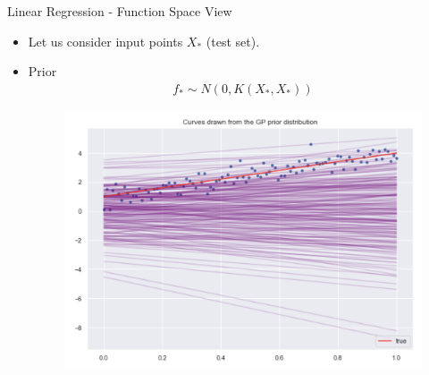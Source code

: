 \documentclass[10pt]{beamer}
\begin{document}
\begin{frame}{Linear Regression - Function Space View}{\cite[Chapter 2.2]{RW05}}
\begin{itemize}
\item Let us consider input points $X_*$ (test set).
\item Prior
\begin{align*}
f_* \sim N(0, K(X_*,X_* ))
\end{align*}
\begin{center}
\begin{figure}
\includegraphics[scale=0.22]{images/gp_lin_prior.png} 
\end{figure}
\end{center}
\end{itemize}
\end{frame}
\end{document}
